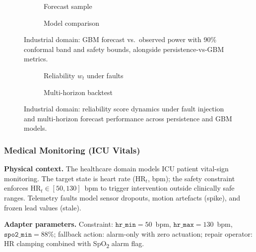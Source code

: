 \begin{figure}[htbp]
  \centering
  \begin{subfigure}[b]{0.48\linewidth}
    \caption{Forecast sample}
  \end{subfigure}
  \hfill
  \begin{subfigure}[b]{0.48\linewidth}
    \caption{Model comparison}
  \end{subfigure}
  \caption{Industrial domain: GBM forecast vs.\ observed power with 90\%
    conformal band and safety bounds, alongside persistence-vs-GBM metrics.}
  \label{fig:industrial-profile}
\end{figure}

\begin{figure}[htbp]
  \centering
  \begin{subfigure}[b]{0.48\linewidth}
    \caption{Reliability $w_t$ under faults}
  \end{subfigure}
  \hfill
  \begin{subfigure}[b]{0.48\linewidth}
    \caption{Multi-horizon backtest}
  \end{subfigure}
  \caption{Industrial domain: reliability score dynamics under fault injection
    and multi-horizon forecast performance across persistence and GBM models.}
  \label{fig:industrial-profile-2}
\end{figure}

\subsubsection{Medical Monitoring (ICU Vitals)}
\label{sec:profile-healthcare}

\textbf{Physical context.}
The healthcare domain models ICU patient vital-sign monitoring.  The
target state is heart rate ($\text{HR}_t$, bpm); the safety constraint
enforces $\text{HR}_t \in [50, 130]$~bpm to trigger intervention outside
clinically safe ranges.  Telemetry faults model sensor dropouts, motion
artefacts (spike), and frozen lead values (stale).

\textbf{Adapter parameters.}
Constraint: $\mathtt{hr\_min} = 50$~bpm, $\mathtt{hr\_max} = 130$~bpm,
$\mathtt{spo2\_min} = 88\%$;
fallback action: alarm-only with zero actuation;
repair operator: HR clamping combined with SpO\textsubscript{2} alarm flag.

